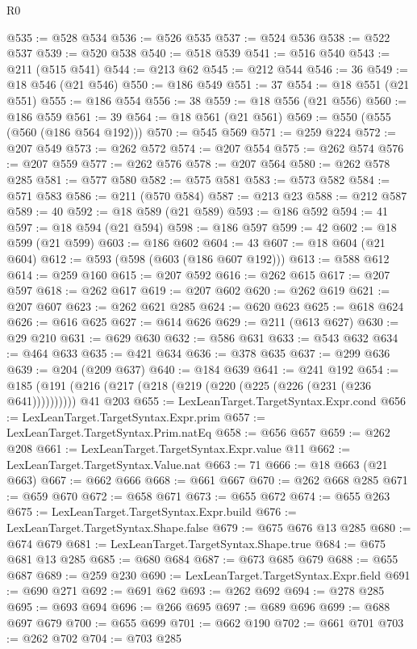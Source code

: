 \begin{lexlean}{R0}
\begin{coremodule}
@535 := @528 @534
@536 := @526 @535
@537 := @524 @536
@538 := @522 @537
@539 := @520 @538
@540 := @518 @539
@541 := @516 @540
@543 := @211 (@515 @541)
@544 := @213 @62
@545 := @212 @544
@546 := 36
@549 := @18 @546 (@21 @546)
@550 := @186 @549
@551 := 37
@554 := @18 @551 (@21 @551)
@555 := @186 @554
@556 := 38
@559 := @18 @556 (@21 @556)
@560 := @186 @559
@561 := 39
@564 := @18 @561 (@21 @561)
@569 := @550 (@555 (@560 (@186 @564 @192)))
@570 := @545 @569
@571 := @259 @224
@572 := @207 @549
@573 := @262 @572
@574 := @207 @554
@575 := @262 @574
@576 := @207 @559
@577 := @262 @576
@578 := @207 @564
@580 := @262 @578 @285
@581 := @577 @580
@582 := @575 @581
@583 := @573 @582
@584 := @571 @583
@586 := @211 (@570 @584)
@587 := @213 @23
@588 := @212 @587
@589 := 40
@592 := @18 @589 (@21 @589)
@593 := @186 @592
@594 := 41
@597 := @18 @594 (@21 @594)
@598 := @186 @597
@599 := 42
@602 := @18 @599 (@21 @599)
@603 := @186 @602
@604 := 43
@607 := @18 @604 (@21 @604)
@612 := @593 (@598 (@603 (@186 @607 @192)))
@613 := @588 @612
@614 := @259 @160
@615 := @207 @592
@616 := @262 @615
@617 := @207 @597
@618 := @262 @617
@619 := @207 @602
@620 := @262 @619
@621 := @207 @607
@623 := @262 @621 @285
@624 := @620 @623
@625 := @618 @624
@626 := @616 @625
@627 := @614 @626
@629 := @211 (@613 @627)
@630 := @29 @210
@631 := @629 @630
@632 := @586 @631
@633 := @543 @632
@634 := @464 @633
@635 := @421 @634
@636 := @378 @635
@637 := @299 @636
@639 := @204 (@209 @637)
@640 := @184 @639
@641 := @241 @192
@654 := @185 (@191 (@216 (@217 (@218 (@219 (@220 (@225 (@226 (@231 (@236 @641)))))))))) @41 @203
@655 := LexLeanTarget.TargetSyntax.Expr.cond
@656 := LexLeanTarget.TargetSyntax.Expr.prim
@657 := LexLeanTarget.TargetSyntax.Prim.natEq
@658 := @656 @657
@659 := @262 @208
@661 := LexLeanTarget.TargetSyntax.Expr.value @11
@662 := LexLeanTarget.TargetSyntax.Value.nat
@663 := 71
@666 := @18 @663 (@21 @663)
@667 := @662 @666
@668 := @661 @667
@670 := @262 @668 @285
@671 := @659 @670
@672 := @658 @671
@673 := @655 @672
@674 := @655 @263
@675 := LexLeanTarget.TargetSyntax.Expr.build
@676 := LexLeanTarget.TargetSyntax.Shape.false
@679 := @675 @676 @13 @285
@680 := @674 @679
@681 := LexLeanTarget.TargetSyntax.Shape.true
@684 := @675 @681 @13 @285
@685 := @680 @684
@687 := @673 @685 @679
@688 := @655 @687
@689 := @259 @230
@690 := LexLeanTarget.TargetSyntax.Expr.field
@691 := @690 @271
@692 := @691 @62
@693 := @262 @692
@694 := @278 @285
@695 := @693 @694
@696 := @266 @695
@697 := @689 @696
@699 := @688 @697 @679
@700 := @655 @699
@701 := @662 @190
@702 := @661 @701
@703 := @262 @702
@704 := @703 @285

\end{coremodule}
\end{lexlean}
